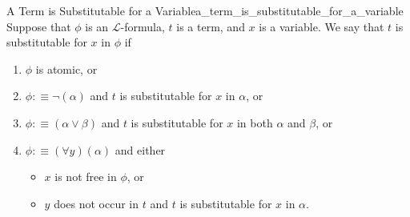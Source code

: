 \begin{definition}{A Term is Substitutable for a Variable}{a_term_is_substitutable_for_a_variable}
Suppose that \(\phi\) is an \(\mathcal{L}\)-formula, \(t\) is a term, and \(x\) is a variable. We say that \(t\) is substitutable for \(x\) in \(\phi\) if
\begin{enumerate}
    \item \(\phi\) is atomic, or
    \item \(\phi: \equiv \neg(\alpha)\) and \(t\) is substitutable for \(x\) in \(\alpha\), or
    \item \(\phi: \equiv(\alpha \vee \beta)\) and \(t\) is substitutable for \(x\) in both \(\alpha\) and \(\beta\), or
    \item \(\phi: \equiv(\forall y)(\alpha)\) and either
    \begin{itemize}
        \item \(x\) is not free in \(\phi\), or
        \item \(y\) does not occur in \(t\) and \(t\) is substitutable for \(x\) in \(\alpha\).
    \end{itemize}
\end{enumerate}
\end{definition}
